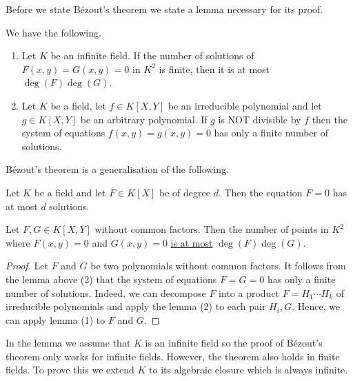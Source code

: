 \documentclass[12pt, a4paper]{article}
\begin{document}
\begin{mdnote}
    Before we state Bézout's theorem we state a lemma necessary for its proof.
\end{mdnote}

\begin{mdlemma}
    We have the following.
    \begin{enumerate}
        \item Let \(K\) be an infinite field. If the number of solutions of \(F(x,y)=G(x,y)=0\) in \(K^2\) is finite, then it is at most \(\deg(F)\deg(G)\).
        \item Let \(K\) be a field, let \(f \in K[X,Y]\) be an irreducible polynomial and let \(g\in K[X,Y]\) be an arbitrary polynomial. If \(g\) is NOT divisible by \(f\) then the system of equations \(f(x,y)=g(x,y)=0\) has only a finite number of solutions.
    \end{enumerate}
\end{mdlemma}

\begin{mdnote}
    Bézout's theorem is a generalisation of the following.
\end{mdnote}

\begin{proposition}
    Let \(K\) be a field and let \(F \in K[X]\) be of degree \(d\). Then the equation \(F=0\) has at most \(d\) solutions.
\end{proposition}

\begin{mdthm}[Bézout]
    Let \(F,G \in K[X,Y]\) without common factors. Then the number of points in \(K^2\) where \(F(x,y)=0\) and \(G(x,y)=0\) \ul{is at most} \(\deg(F)\deg(G)\).
\end{mdthm}

\begin{proof}
    Let \(F\) and \(G\) be two polynomials without common factors. It follows from the lemma above (2) that the system of equations \(F=G=0\) has only a finite number of solutions. Indeed, we can decompose \(F\) into a product \(F = H_1\cdots H_k\) of irreducible polynomials and apply the lemma (2) to each pair \(H_i,G\). Hence, we can apply lemma (1) to \(F\) and \(G\).
\end{proof}

\begin{mdremark}
    In the lemma we assume that \(K\) is an infinite field so the proof of Bézout's theorem only works for infinite fields. However, the theorem also holds in finite fields. To prove this we extend \(K\) to its algebraic closure which is always infinite.
\end{mdremark}
\end{document}
